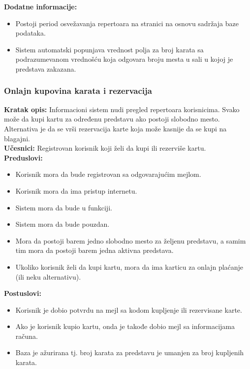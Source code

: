 \documentclass[a4paper]{article}
\begin{document}
\noindent\textbf{Dodatne informacije:} 
  \begin{itemize}
    \item Postoji period osvežavanja repertoara na stranici na osnovu
          sadržaja baze podataka. 
    \item Sistem automatski popunjava vrednost polja za broj karata sa podrazumevanom
          vrednošću koja odgovara broju mesta u sali u kojoj je predstava zakazana.
  \end{itemize}

\subsubsection{Onlajn kupovina karata i rezervacija}

\noindent\textbf{Kratak opis:} Informacioni sistem nudi pregled repertoara korisnicima. 
        Svako može da kupi kartu za određenu predstavu ako postoji slobodno mesto.
        Alternativa je da se vrši rezervacija karte koja može kasnije da se kupi na blagajni.\\

\noindent\textbf{Učesnici:} Registrovan korisnik koji želi da kupi ili rezerviše kartu.\\

\noindent\textbf{Preduslovi:} 
  \begin{itemize}
    \item Korisnik mora da bude registrovan sa odgovarajućim mejlom. 
    \item Korisnik mora da ima pristup internetu.
    \item Sistem mora da bude u funkciji.
    \item Sistem mora da bude pouzdan. 
    \item Mora da postoji barem jedno slobodno mesto za željenu predstavu, a samim tim mora da 
          postoji barem jedna aktivna predstava. 
    \item Ukoliko korisnik želi da kupi kartu, mora da ima karticu za onlajn plaćanje (ili 
          neku alternativu).
  \end{itemize}
  
\noindent\textbf{Postuslovi:} 
  \begin{itemize}
    \item Korisnik je dobio potvrdu na mejl sa kodom kupljenje ili rezervisane karte.
    \item Ako je korisnik kupio kartu, onda je takođe dobio mejl sa informacijama računa.
    \item Baza je ažurirana tj. broj karata za predstavu je umanjen za broj kupljenih karata.
  \end{itemize}
\end{document}

